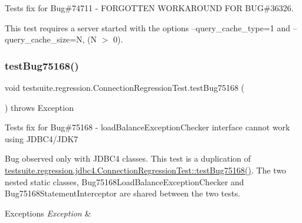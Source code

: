 Tests fix for Bug\#74711 -\/ F\+O\+R\+G\+O\+T\+T\+EN W\+O\+R\+K\+A\+R\+O\+U\+ND F\+OR B\+UG\#36326.

This test requires a server started with the options \textquotesingle{}--query\+\_\+cache\+\_\+type=1\textquotesingle{} and \textquotesingle{}--query\+\_\+cache\+\_\+size=N\textquotesingle{}, (N $>$ 0). \mbox{\label{classtestsuite_1_1regression_1_1_connection_regression_test_a481102d0bf994ee0a48b67f1a1328c43}} 
\subsubsection{\texorpdfstring{test\+Bug75168()}{testBug75168()}}
{\footnotesize\ttfamily void testsuite.\+regression.\+Connection\+Regression\+Test.\+test\+Bug75168 (\begin{DoxyParamCaption}{ }\end{DoxyParamCaption}) throws Exception}

Tests fix for Bug\#75168 -\/ load\+Balance\+Exception\+Checker interface cannot work using J\+D\+B\+C4/\+J\+D\+K7

Bug observed only with J\+D\+B\+C4 classes. This test is a duplication of \mbox{\hyperlink{classtestsuite_1_1regression_1_1jdbc4_1_1_connection_regression_test_acc4c393fcbc483c6a959f10f561bb1b7}{testsuite.\+regression.\+jdbc4.\+Connection\+Regression\+Test\+::test\+Bug75168()}}. The two nested static classes, Bug75168\+Load\+Balance\+Exception\+Checker and Bug75168\+Statement\+Interceptor are shared between the two tests.


\begin{DoxyExceptions}{Exceptions}
{\em Exception} & \\
\hline
\end{DoxyExceptions}
\mbox{\label{classtestsuite_1_1regression_1_1_connection_regression_test_a0cc242ab6f5c5f0c1bb19d14d37bb866}} 
